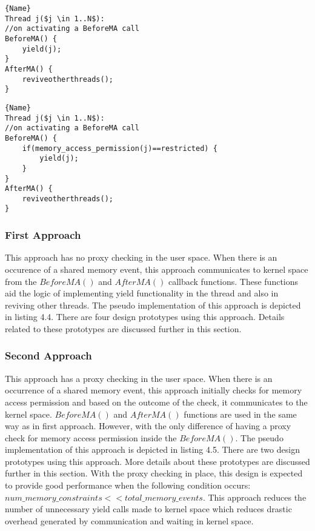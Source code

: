 \noindent\begin{minipage}{.45\textwidth}
\begin{lstlisting}[mathescape=true,style=customc,caption=First Approach,frame=tlrb]{Name}
Thread j($j \in 1..N$): 
//on activating a BeforeMA call
BeforeMA() {
	yield(j);
}
AfterMA() {
	reviveotherthreads();
}
\end{lstlisting}
\label{first_approach}
\end{minipage}\hfill
\begin{minipage}{.45\textwidth}
\begin{lstlisting}[mathescape=true,style=customc,caption=Second Approach,frame=tlrb]{Name}
Thread j($j \in 1..N$): 
//on activating a BeforeMA call
BeforeMA() {
	if(memory_access_permission(j)==restricted) {
		yield(j);
	}
}
AfterMA() {
	reviveotherthreads();
}
\end{lstlisting}
\label{second_approach}
\end{minipage}


\subsubsection{First Approach}

This approach has no proxy checking in the user space. 
When there is an occurence of a shared memory event, this approach communicates to kernel space from the $BeforeMA()$ and $AfterMA()$ callback functions. 
These functions aid the logic of implementing yield functionality in the thread and also in reviving other threads. 
The pseudo implementation of this approach is depicted in listing 4.4.
There are four design prototypes using this approach. 
Details related to these prototypes are discussed further in this section.

\subsubsection{Second Approach}

This approach has a proxy checking in the user space. 
When there is an occurrence of a shared memory event, this approach initially checks for memory access permission and based on the outcome of the check, it communicates to the kernel space. 
$BeforeMA()$ and $AfterMA()$ functions are used in the same way as in first approach. 
However, with the only difference of having a proxy check for memory access permission inside the $BeforeMA()$. 
The pseudo implementation of this approach is depicted in listing 4.5.
There are two design prototypes using this approach. More details about these prototypes are discussed further in this section.
With the proxy checking in place, this design is expected to provide good performance when the following condition occurs: $num\_memory\_constraints << total\_memory\_events$. 
This approach reduces the number of unnecessary yield calls made to kernel space which reduces drastic overhead generated by communication and waiting in kernel space.



